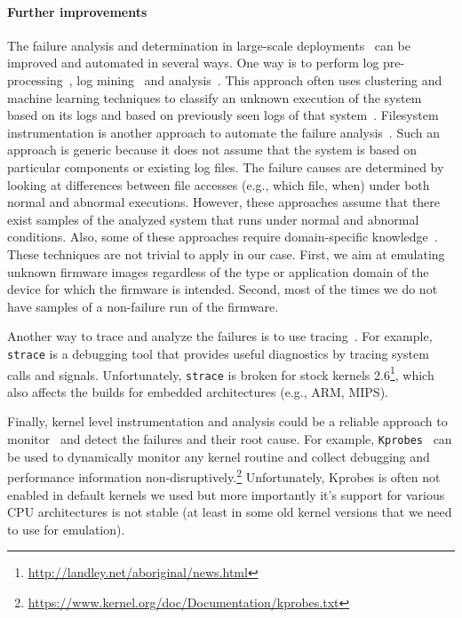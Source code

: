 \documentclass[conference]{./templates/ndss/IEEEtran}
\newcounter{t0d0_counter}
\newcounter{pr00f_counter}
\begin{document}
\paragraph{Further improvements}

The failure analysis and determination in large-scale deployments~\cite{chen2002pinpoint} 
can be improved and automated in several ways. 
One way is to perform log pre-processing~\cite{zheng2009system}, 
log mining~\cite{lim2008log} and analysis~\cite{xu2009detecting}. 
This approach often uses clustering and machine learning techniques 
to classify an unknown execution of the system based on its logs and 
based on previously seen logs of that system~\cite{cohen2004correlating,lin1990error}. 
Filesystem instrumentation is another approach to automate the failure 
analysis~\cite{huang2011assisting}. Such an approach is generic because it 
does not assume that the system is based on particular components or existing 
log files. The failure causes are determined by looking at differences 
between file accesses (e.g., which file, when) under both normal and abnormal 
executions. 
However, these approaches assume that there exist 
samples of the analyzed system that runs under normal and abnormal conditions. 
Also, some of these approaches require domain-specific knowledge~\cite{lim2008log}. 
These techniques are not trivial to apply in our case. First, we aim at 
emulating unknown firmware images regardless of the type or application 
domain of the device for which the firmware is intended. 
Second, most of the times we do not have samples of a non-failure run of 
the firmware. 

Another way to trace and analyze the failures is to use tracing~\cite{ding2011automatic}. 
For example, \texttt{strace} is a debugging tool that provides useful 
diagnostics by tracing system calls and signals. 
Unfortunately, \texttt{strace} is broken for stock kernels 
2.6\footnote{\url{http://landley.net/aboriginal/news.html}}, which also 
affects the builds for embedded architectures (e.g., ARM, MIPS). 

Finally, kernel level instrumentation and analysis could be a reliable 
approach to monitor~\cite{jarboui2002experimental} and detect the failures 
and their root cause. 
For example, \texttt{Kprobes}~\cite{mavinakayanahalli2006probing,krishnakumar2005kernel} 
can be used to dynamically monitor any kernel routine and
collect debugging and performance information 
non-disruptively.\footnote{\url{https://www.kernel.org/doc/Documentation/kprobes.txt}}
Unfortunately, Kprobes is often not enabled in default kernels we used but more importantly it's support for various CPU architectures is not stable
(at least in some old kernel versions that we need to use for emulation).
\end{document}
